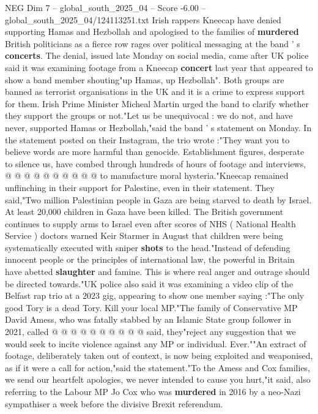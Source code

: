 \begin{textsample}{NEG Dim 7 – global\_south\_2025\_04 – Score -6.00 – global\_south\_2025\_04/124113251.txt}  \label{ex:f7_neg_306}
Irish rappers Kneecap have denied supporting Hamas and Hezbollah and apologised to the families of \textbf{murdered} British politicians as a fierce row rages over political messaging at the band ' s \textbf{concerts}.
The denial, issued late Monday on social media, came after UK police said it was examining footage from a Kneecap \textbf{concert} last year that appeared to show a band member shouting"up Hamas, up Hezbollah".
Both groups are banned as terrorist organisations in the UK and it is a crime to express support for them.
Irish Prime Minister Micheal Martin urged the band to clarify whether they support the groups or not."Let us be unequivocal : we do not, and have never, supported Hamas or Hezbollah,"said the band ' s statement on Monday.
In the statement posted on their Instagram, the trio wrote :"They want you to believe words are more harmful than genocide.
Establishment figures, desperate to silence us, have combed through hundreds of hours of footage and interviews, @ @ @ @ @ @ @ @ @ @ to manufacture moral hysteria."Kneecap remained unflinching in their support for Palestine, even in their statement.
They said,"Two million Palestinian people in Gaza are being starved to death by Israel.
At least 20,000 children in Gaza have been killed.
The British government continues to supply arms to Israel even after scores of NHS ( National Health Service ) doctors warned Keir Starmer in August that children were being systematically executed with sniper \textbf{shots} to the head."Instead of defending innocent people or the principles of international law, the powerful in Britain have abetted \textbf{slaughter} and famine.
This is where real anger and outrage should be directed towards."UK police also said it was examining a video clip of the Belfast rap trio at a 2023 gig, appearing to show one member saying :"The only good Tory is a dead Tory.
Kill your local MP."The family of Conservative MP David Amess, who was fatally stabbed by an Islamic State group follower in 2021, called @ @ @ @ @ @ @ @ @ @ said, they"reject any suggestion that we would seek to incite violence against any MP or individual.
Ever.""An extract of footage, deliberately taken out of context, is now being exploited and weaponised, as if it were a call for action,"said the statement."To the Amess and Cox families, we send our heartfelt apologies, we never intended to cause you hurt,"it said, also referring to the Labour MP Jo Cox who was \textbf{murdered} in 2016 by a neo-Nazi sympathiser a week before the divisive Brexit referendum.

\end{textsample}
